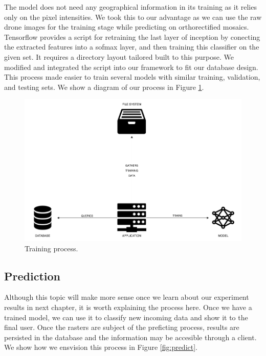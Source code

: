 The model does not need any geographical information in its training as it relies only on the pixel intensities. We took this to our advantage as we can use the raw drone images for the training stage while predicting on orthorectified mosaics. Tensorflow provides a script for retraining the last layer of inception by conecting the extracted features into a sofmax layer, and then training this classifier on the given set. It requires a directory layout tailored built to this purpose. We modified and integrated the script into our framework to fit our database design. This process made easier to train several models with similar training, validation, and testing sets. We show a diagram of our process in Figure \ref{fig:train}.\\


\begin{figure}[!h]
  \centering
  \includegraphics[width=1\textwidth]{images/train-diagram.png}
  \caption{Training process.}
  \label{fig:train}
\end{figure}

\subsection{Prediction}

Although this topic will make more sense once we learn about our experiment results in next chapter, it is worth explaining the process here. Once we have a trained model, we can use it to classify new incoming data and show it to the final user. Once the rasters are subject of the preficting process, results are persisted in the database and the information may be accesible through a client. We show how we ensvision this process in Figure \ref{fig:predict}.\\

